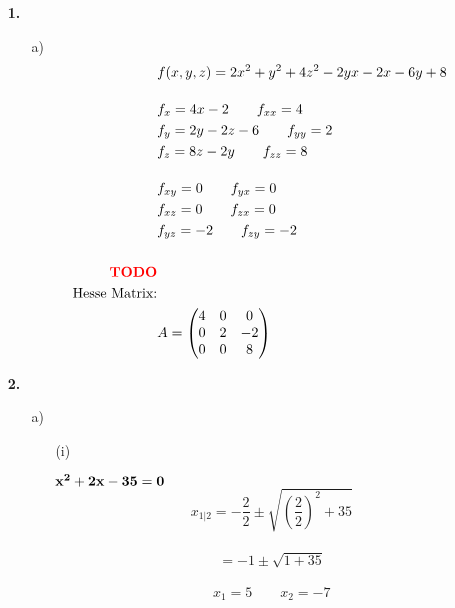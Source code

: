 \documentclass[a4paper,11pt]{article}
\title{\titleinfo}
\author{\authorinfotitle}
\date{\today}
\begin{document}
\maketitle
    \begin{enumerate}

            \item[\textbf{1.}]
            \begin{enumerate}
            	\item[a)]
            	\begin{align*}
	                &f(x,y,z) = 2x^2+y^2+4z^2-2yx-2x-6y+8 \\[0.4cm]
	                &f_x = 4x -2 \qquad f_{xx} = 4 \\
	                &f_y = 2y -2z -6 \qquad f_{yy} = 2\\
	                &f_z = 8z -2y \qquad f_{zz} = 8 \\[0.4cm]
	                &f_{xy} = 0 \qquad f_{yx} = 0 \\
	                &f_{xz} = 0 \qquad f_{zx} = 0 \\
	                &f_{yz} = -2 \qquad f_{zy} = -2 \\ \\
	                \textbf{\textcolor{red}{TODO}} \\
	                \text{Hesse Matrix:} \\
	                &A = \begin{pmatrix}
	                	 4 & 0 & 0 \\
	                	 0 & 2 & -2 \\
	                	 0 & 0 & 8 \\
	                \end{pmatrix}
            	\end{align*}

            \end{enumerate}
            \item[\textbf{2.}]
            \begin{enumerate}
            	\item[a)]
            		\begin{enumerate}
            			\item[(i)]
            			
            			     $\bold{x^2+2x-35 = 0}$ \\
            			     $$x_{1|2} = -\frac{2}{2} \pm \sqrt{\left(\frac{2}{2}\right)^2+35}$$ \\
            			     $$= -1 \pm \sqrt{1+35}$$ \\[0.4cm]
            			     $$x_1 = 5 \qquad x_2 = -7$$ \\
            			     

\end{enumerate}
\end{enumerate}
\end{enumerate}
\end{document}
